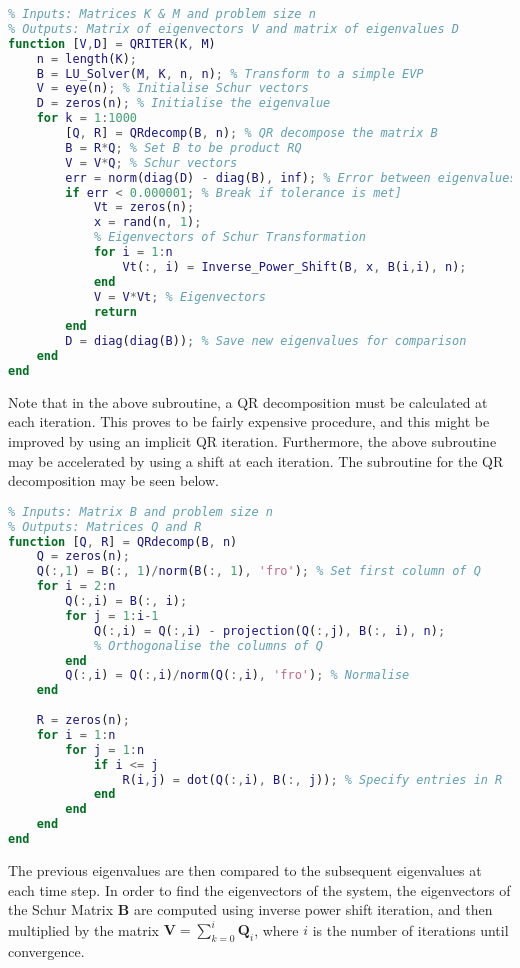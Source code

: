 \documentclass[11pt,oneside]{article}
\begin{document}
\begin{lstlisting}[language=Matlab]
%% QR Iteration Function
% Inputs: Matrices K & M and problem size n
% Outputs: Matrix of eigenvectors V and matrix of eigenvalues D
function [V,D] = QRITER(K, M)
    n = length(K);
    B = LU_Solver(M, K, n, n); % Transform to a simple EVP
    V = eye(n); % Initialise Schur vectors
    D = zeros(n); % Initialise the eigenvalue
    for k = 1:1000
        [Q, R] = QRdecomp(B, n); % QR decompose the matrix B
        B = R*Q; % Set B to be product RQ
        V = V*Q; % Schur vectors
        err = norm(diag(D) - diag(B), inf); % Error between eigenvalues
        if err < 0.000001; % Break if tolerance is met]
            Vt = zeros(n);
            x = rand(n, 1);
            % Eigenvectors of Schur Transformation
            for i = 1:n
                Vt(:, i) = Inverse_Power_Shift(B, x, B(i,i), n);
            end
            V = V*Vt; % Eigenvectors  
            return
        end
        D = diag(diag(B)); % Save new eigenvalues for comparison
    end
end
\end{lstlisting}

Note that in the above subroutine, a QR decomposition must be calculated at each iteration. This proves to be fairly expensive procedure, and this might be improved by using an implicit QR iteration. Furthermore, the above subroutine may be accelerated by using a shift at each iteration. The subroutine for the QR decomposition may be seen below.

\begin{lstlisting}[language=Matlab]
%% QR Decomposition function
% Inputs: Matrix B and problem size n
% Outputs: Matrices Q and R
function [Q, R] = QRdecomp(B, n)
    Q = zeros(n); 
    Q(:,1) = B(:, 1)/norm(B(:, 1), 'fro'); % Set first column of Q
    for i = 2:n
        Q(:,i) = B(:, i);
        for j = 1:i-1
            Q(:,i) = Q(:,i) - projection(Q(:,j), B(:, i), n); 
            % Orthogonalise the columns of Q
        end
        Q(:,i) = Q(:,i)/norm(Q(:,i), 'fro'); % Normalise
    end
    
    R = zeros(n);
    for i = 1:n
        for j = 1:n
            if i <= j
                R(i,j) = dot(Q(:,i), B(:, j)); % Specify entries in R
            end
        end
    end
end
\end{lstlisting}

The previous eigenvalues are then compared to the subsequent eigenvalues at each time step. In order to find the eigenvectors of the system, the eigenvectors of the Schur Matrix $\mathbf{B}$ are computed using inverse power shift iteration, and then multiplied by the matrix $\mathbf{V} = \sum_{k = 0}^i \mathbf{Q}_i$, where $i$ is the number of iterations until convergence.
\end{document}
